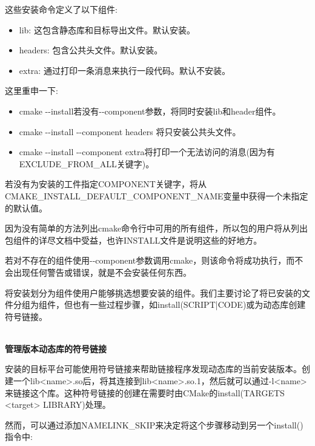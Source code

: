 这些安装命令定义了以下组件:

\begin{itemize}
\item 
lib: 这包含静态库和目标导出文件。默认安装。

\item 
headers: 包含公共头文件。默认安装。

\item 
extra: 通过打印一条消息来执行一段代码。默认不安装。
\end{itemize}

这里重申一下:

\begin{itemize}
\item 
cmake -{}-install若没有-{}-component参数，将同时安装lib和header组件。

\item 
cmake -{}-install -{}-component headers 将只安装公共头文件。

\item 
cmake -{}-install -{}-component extra将打印一个无法访问的消息(因为有EXCLUDE\_FROM\_ALL关键字)。
\end{itemize}

若没有为安装的工件指定COMPONENT关键字，将从CMAKE\_INSTALL\_DEFAULT\_COMPONENT\_NAME变量中获得一个未指定的默认值。

\begin{tcolorbox}[colback=blue!5!white,colframe=blue!75!black,title=Note]
因为没有简单的方法列出cmake命令行中可用的所有组件，所以包的用户将从列出包组件的详尽文档中受益，也许INSTALL文件是说明这些的好地方。
\end{tcolorbox}

若对不存在的组件使用-{}-component参数调用cmake，则该命令将成功执行，而不会出现任何警告或错误，就是不会安装任何东西。

将安装划分为组件使用户能够挑选想要安装的组件。我们主要讨论了将已安装的文件分组为组件，但也有一些过程步骤，如install(SCRIPT|CODE)或为动态库创建符号链接。

\hspace*{\fill} \\ %
\noindent
\textbf{管理版本动态库的符号链接}

安装的目标平台可能使用符号链接来帮助链接程序发现动态库的当前安装版本。创建一个lib<name>.so后，将其连接到lib<name>.so.1，然后就可以通过-l<name>来链接这个库。这种符号链接的创建在需要时由CMake的install(TARGETS <target> LIBRARY)处理。

然而，可以通过添加NAMELINK\_SKIP来决定将这个步骤移动到另一个install()指令中:

